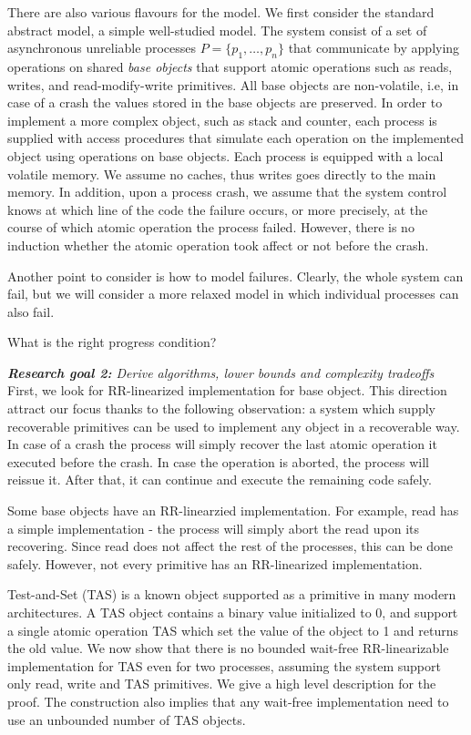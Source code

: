 \documentclass[11pt]{article}
\begin{document}
There are also various flavours for the model. We first consider the standard abstract model, a simple well-studied model. The system consist of a set of asynchronous unreliable processes $P=\{p_1,\ldots,p_n\}$ that communicate by applying operations on shared \emph{base objects} that support atomic operations such as reads, writes, and read-modify-write primitives. All base objects are non-volatile, i.e, in case of a crash the values stored in the base objects are preserved. In order to implement a more complex object, such as stack and counter, each process is supplied with access procedures that simulate each operation on the implemented object using operations on base objects. Each process is equipped with a local volatile memory. We assume no caches, thus writes goes directly to the main memory. In addition, upon a process crash, we assume that the system control knows at which line of the code the failure occurs, or more precisely, at the course of which atomic operation the process failed. However, there is no induction whether the atomic operation took affect or not before the crash.

Another point to consider is how to model failures.
Clearly, the whole system can fail, but we will consider a more relaxed model in which individual processes can also fail.


What is the right progress condition?


\noindent \emph{{\bf Research goal 2:} Derive algorithms, lower bounds and complexity tradeoffs}\\
First, we look for RR-linearized implementation for base object. This direction attract our focus thanks to the following observation: a system which supply recoverable primitives can be used to implement any object in a recoverable way. In case of a crash the process will simply recover the last atomic operation it executed before the crash. In case the operation is aborted, the process will reissue it. After that, it can continue and execute the remaining code safely.

Some base objects have an RR-linearzied implementation. For example, read has a simple implementation - the process will simply abort the read upon its recovering. Since read does not affect the rest of the processes, this can be done safely. However, not every primitive has an RR-linearized implementation.

Test-and-Set (TAS) is a known object supported as a primitive in many modern architectures. A TAS object contains a binary value initialized to 0, and support a single atomic operation TAS which set the value of the object to 1 and returns the old value.
We now show that there is no bounded wait-free RR-linearizable implementation for TAS even for two processes, assuming the system support only read, write and TAS primitives. We give a high level description for the proof. The construction also implies that any wait-free implementation need to use an unbounded number of TAS objects.
\end{document}
